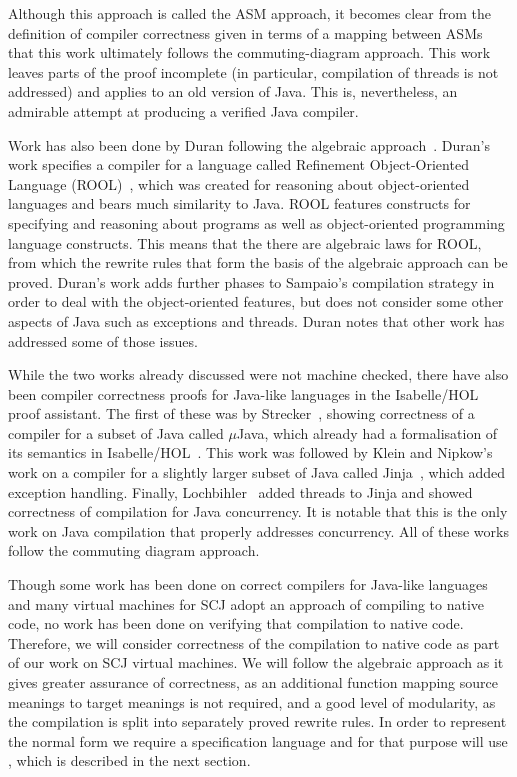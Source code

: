 \documentclass[a4paper,10pt]{report}
\begin{document}
Although this approach is called the ASM approach, it becomes clear from the
definition of compiler correctness given in terms of a mapping between ASMs that
this work ultimately follows the commuting-diagram approach.  This work leaves
parts of the proof incomplete (in particular, compilation of threads is not
addressed) and applies to an old version of Java.  This is, nevertheless, an
admirable attempt at producing a verified Java compiler.

Work has also been done by Duran following the algebraic
approach~\cite{duran2005, duran2010}.  Duran's work specifies a compiler for a
language called Refinement Object-Oriented Language (ROOL)~\cite{borba2000},
which was created for reasoning about object-oriented languages and bears much
similarity to Java.  ROOL features constructs for specifying and reasoning about
programs as well as object-oriented programming language constructs.  This means
that the there are algebraic laws for ROOL, from which the rewrite rules that
form the basis of the algebraic approach can be proved.  Duran's work adds
further phases to Sampaio's compilation strategy in order to deal with the
object-oriented features, but does not consider some other aspects of Java such
as exceptions and threads.  Duran notes that other work has addressed some of
those issues.

While the two works already discussed were not machine checked, there have also
been compiler correctness proofs for Java-like languages in the Isabelle/HOL
proof assistant.  The first of these was by Strecker~\cite{strecker2002},
showing correctness of a compiler for a subset of Java called $\mu$Java, which
already had a formalisation of its semantics in Isabelle/HOL~\cite{nipkow2000}.
This work was followed by Klein and Nipkow's work on a compiler for a slightly
larger subset of Java called Jinja~\cite{klein2006}, which added exception
handling.  Finally, Lochbihler~\cite{lochbihler2010} added threads to Jinja and
showed correctness of compilation for Java concurrency.  It is notable that this
is the only work on Java compilation that properly addresses concurrency.  All
of these works follow the commuting diagram approach.

Though some work has been done on correct compilers for Java-like languages and
many virtual machines for SCJ adopt an approach of compiling to native code, no
work has been done on verifying that compilation to native code.  Therefore, we
will consider correctness of the compilation to native code as part of our work
on SCJ virtual machines.  We will follow the algebraic approach as it gives
greater assurance of correctness, as an additional function mapping source
meanings to target meanings is not required, and a good level of modularity, as
the compilation is split into separately proved rewrite rules.  In order to
represent the normal form we require a specification language and for that
purpose will use \Circus{}, which is described in the next section.
\end{document}
